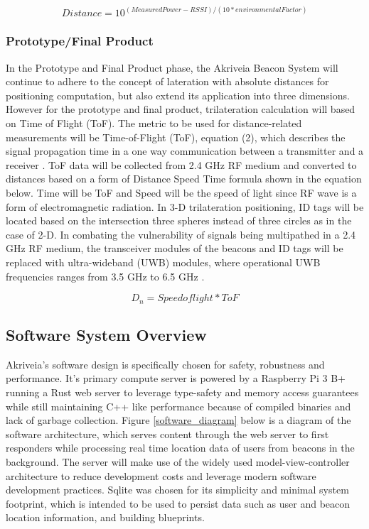 \begin{equation}
    Distance = 10^{(Measured Power - RSSI)/(10*environmental Factor)}
\end{equation}

\subsubsection{Prototype/Final Product}
In the Prototype and Final Product phase, the Akriveia Beacon System will continue to adhere to the concept of lateration with absolute distances for positioning computation, but also extend its application into three dimensions. However for the prototype and final product, trilateration calculation will based on Time of Flight (ToF). The metric to be used for distance-related measurements will be Time-of-Flight (ToF), equation (2), which describes the signal propagation time in a one way communication between a transmitter and a receiver \cite{R6}. ToF data will be collected from 2.4 GHz RF medium and converted to distances based on a form of Distance Speed Time formula shown in the equation below. Time will be ToF and Speed will be the speed of light since RF wave is a form of electromagnetic radiation. In 3-D trilateration positioning, ID tags will be located based on the intersection three spheres instead of three circles as in the case of 2-D. In combating the vulnerability of signals being multipathed in a 2.4 GHz RF medium, the transceiver modules of the beacons and ID tags will be replaced with ultra-wideband (UWB) modules, where operational UWB frequencies ranges from 3.5 GHz to 6.5 GHz \cite{R4}.

\begin{equation}
    D_n = Speed of light * ToF
\end{equation}

\break

\subsection{Software System Overview}
Akriveia's software design is specifically chosen for safety, robustness and performance. It's primary compute server is powered by a Raspberry Pi 3 B+ running a Rust web server to leverage type-safety and memory access guarantees while still maintaining C++ like performance because of compiled binaries and lack of garbage collection. Figure \ref{software_diagram} below is a diagram of the software architecture, which serves content through the web server to first responders while processing real time location data of users from beacons in the background. The server will make use of the widely used model-view-controller architecture to reduce development costs and leverage modern software development practices. Sqlite was chosen for its simplicity and minimal system footprint, which is intended to be used to persist data such as user and beacon location information, and building blueprints.

